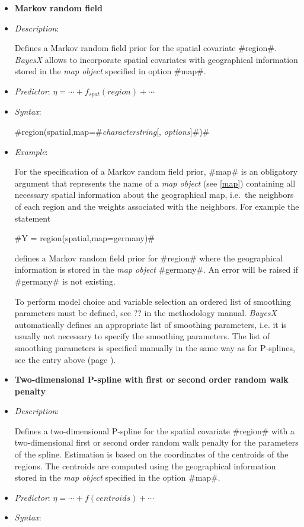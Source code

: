 \begin{itemize}
\item[]{\bf\sffamily Markov random field}

\item[] {\em Description}:

Defines a Markov random field prior for the spatial covariate
#region#. {\em BayesX} allows to incorporate spatial covariates
with geographical information stored in the {\em map object}
specified in option #map#.
\item[] {\em Predictor}: $\eta = \cdots
+ f_{spat}(region) + \cdots$ \item[] {\em Syntax}:

#region(spatial,map=#{\em characterstring}[, {\em options}]#)#
\item[] {\em Example}:

For the specification of a Markov random field prior, #map# is an
obligatory argument that represents the name of a {\em map object}
(see \autoref{map}) containing all necessary spatial information
about the geographical map, i.e.~the neighbors of each region and
the weights associated with the neighbors. For example the
statement

#Y = region(spatial,map=germany)#

defines a Markov random field prior for #region# where the
geographical information is stored in the {\em map object}
#germany#. An error will be raised if #germany# is not existing.

To perform model choice and variable selection an ordered list of smoothing parameters must be defined, see ??
in the methodology manual. {\em BayesX} automatically defines an appropriate list of smoothing parameters, i.e. it
is usually not necessary to  specify the smoothing parameters.
The list of smoothing parameters is specified manually in the same way as for P-splines,
see the entry above (page \pageref{psplines_stepwise}).


\item[]{\bf\sffamily Two-dimensional P-spline with first or second order
random walk penalty}

\item[] {\em Description}:

Defines a two-dimensional P-spline for the spatial covariate
#region# with a two-dimensional first or second order random walk penalty
for the parameters of the spline. Estimation is based on the
coordinates of the centroids of the regions. The centroids are
computed using the geographical information stored in the {\em map
object} specified in the option #map#.
\item[] {\em Predictor}:
$\eta= \cdots + f(centroids) + \cdots$ \item[] {\em Syntax}:


\end{itemize}
